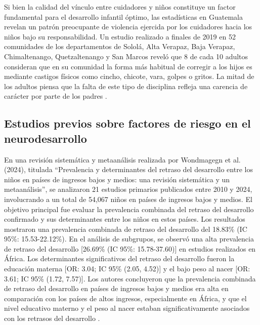 Si bien la calidad del vínculo entre cuidadores y niños constituye un factor
fundamental para el desarrollo infantil óptimo, las estadísticas en Guatemala
revelan un patrón preocupante de violencia ejercida por los cuidadores hacia
los niños bajo su responsabilidad. Un estudio realizado a finales de 2019 en 52
comunidades de los departamentos de Sololá, Alta Verapaz, Baja Verapaz,
Chimaltenango, Quetzaltenango y San Marcos reveló que 8 de cada 10 adultos
consideran que en su comunidad la forma más habitual de corregir a los hijos es
mediante castigos físicos como cincho, chicote, vara, golpes o gritos. La mitad
de los adultos piensa que la falta de este tipo de disciplina refleja una
carencia de carácter por parte de los padres
\cite{PoliticaInfanciaGuate, UNICEFComportamientosNinez}.

\subsection{Estudios previos sobre factores de riesgo en el neurodesarrollo}
En una revisión sistemática y metaanálisis realizada por Wondmagegn et al.
(2024), titulada ``Prevalencia y determinantes del retraso del desarrollo entre
los niños en países de ingresos bajos y medios: una revisión sistemática y un
metaanálisis'', se analizaron 21 estudios primarios publicados entre 2010 y
2024, involucrando a un total de 54,067 niños en países de ingresos bajos y
medios. El objetivo principal fue evaluar la prevalencia combinada del retraso
del desarrollo confirmado y sus determinantes entre los niños en estos países.
Los resultados mostraron una prevalencia combinada de retraso del desarrollo
del 18.83\% (IC 95\%: 15.53-22.12\%). En el análisis de subgrupos, se observó
una alta prevalencia de retraso del desarrollo [26.69\% (IC 95\%: 15.78-37.60)]
en estudios realizados en África. Los determinantes significativos del retraso
del desarrollo fueron la educación materna [OR: 3.04; IC 95\% (2.05, 4.52)] y
el bajo peso al nacer [OR: 3.61; IC 95\% (1.72, 7.57)]. Los autores concluyeron
que la prevalencia combinada de retraso del desarrollo en países de ingresos
bajos y medios era alta en comparación con los países de altos ingresos,
especialmente en África, y que el nivel educativo materno y el peso al nacer
estaban significativamente asociados con los retrasos del desarrollo
\cite{Wondmagegn2024}.

